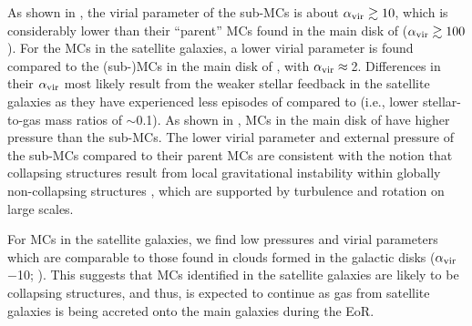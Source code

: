 \IfFileExists{emulateapjlegacy.cls}{\documentclass[iop]{emulateapjlegacy}}{\documentclass[iop]{emulateapj}}
\newcommand{\DL}[1]{({\bf \color{dlcolor} DL: #1})}
\begin{document}

As shown in , the virial parameter of the sub-MCs is about $\alpha_{\rm vir}\gtrsim10$, which 
is considerably lower than their ``parent'' MCs found in the main disk of \flower ($\alpha_{\rm vir}\gtrsim100$).
For the MCs in the satellite galaxies, a lower virial parameter is found 
compared to the (sub-)MCs in the main disk of \flower, with $\alpha_{\rm vir}\approx$\,2.
Differences in their $\alpha_{\rm vir}$ most likely result from the weaker
stellar feedback in the satellite galaxies as they have experienced less episodes of \SF compared to
\flower (i.e., lower stellar-to-gas mass ratios of $\sim$0.1).
As shown in , MCs in the main disk of \flower have higher pressure than the sub-MCs.
The lower virial parameter and external pressure of the sub-MCs
compared to their parent MCs are consistent with
the notion that collapsing structures result from local gravitational
instability within globally non-collapsing structures \citep[see e.g.,][]{Ballesteros-Paredes11a},
which are supported by turbulence and rotation on large scales.

For MCs in the satellite galaxies, we find low pressures and virial parameters 
which are comparable to those found in clouds formed in the galactic disks 
($\alpha_{\rm vir}$$-$10; \citealt{Dobbs08a, Tasker09a}).
This suggests that MCs identified in the satellite galaxies are likely to be collapsing structures,
and thus, \SF is expected to continue 
as gas from satellite galaxies is being accreted onto the main galaxies during the EoR.
\end{document}
